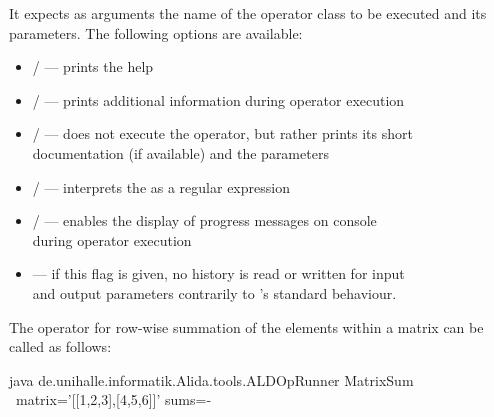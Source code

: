 \vspace*{-0.25cm}
It expects as arguments the name of the operator class to be executed and its
parameters. The following options are available:
\begin{itemize}
  \item {} /  \hspace*{0.5cm} --- \hspace*{0.5cm}
  	prints the help
  \item {} /  \hspace*{0.5cm} --- \hspace*{0.5cm}
  	prints additional information during operator execution
  \item {} /  \hspace*{0.5cm} --- \hspace*{0.5cm}
    does not execute the operator, but rather prints its short \\
    \hspace*{4.8cm}documentation (if available) and the parameters
  \item {} /  \hspace*{0.5cm} --- \hspace*{0.5cm}
        interprets the   as a regular expression
  \item {} /  \hspace*{0.5cm} --- \hspace*{0.5cm}
        enables the display of progress messages on console \\
        \hspace*{5.65cm}during operator execution
  \item {} \hspace*{0.5cm} --- \hspace*{0.5cm}
        if this flag is given, no history is read or written for input\\
        \hspace*{4cm}and output parameters contrarily to \alida's standard
        behaviour.
\end{itemize}
The operator  for row-wise summation of the elements within a
matrix can be called as follows:
\vspace*{0.5cm}
\begin{code}
java de.unihalle.informatik.Alida.tools.ALDOpRunner MatrixSum \
      matrix='[[1,2,3],[4,5,6]]' sums=-
\end{code}

